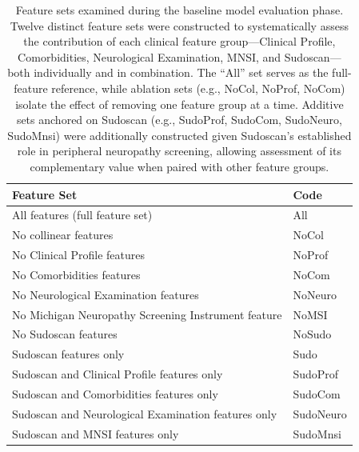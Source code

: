 \documentclass[pdflatex,sn-mathphys-num]{sn-jnl}%
\theoremstyle{thmstyleone}%
\theoremstyle{thmstyletwo}%
\theoremstyle{thmstylethree}%
\begin{document}
\begin{appendices}
\begin{table}[tbp]
    \centering
    \small
    \begin{tabular}{ll}
        \toprule
        Feature Set & Code  \\
        \midrule
        All features (full feature set) &  All   \\
        No collinear features  &  NoCol\\
        No Clinical Profile features  &  NoProf\\
        No Comorbidities features & NoCom \\
        No Neurological Examination features & NoNeuro \\
        No Michigan Neuropathy Screening Instrument feature & NoMSI  \\
        No Sudoscan features & NoSudo \\
        Sudoscan features only & Sudo \\
        Sudoscan and Clinical Profile features only & SudoProf \\
        Sudoscan and Comorbidities features only & SudoCom \\
        Sudoscan and Neurological Examination features only & SudoNeuro \\
        Sudoscan and MNSI features only & SudoMnsi \\
        \bottomrule
    \end{tabular}
    \caption{Feature sets examined during the baseline model evaluation phase. Twelve distinct feature sets were constructed to systematically assess the contribution of each clinical feature group---Clinical Profile, Comorbidities, Neurological Examination, MNSI, and Sudoscan---both individually and in combination. The ``All'' set serves as the full-feature reference, while ablation sets (e.g., NoCol, NoProf, NoCom) isolate the effect of removing one feature group at a time. Additive sets anchored on Sudoscan (e.g., SudoProf, SudoCom, SudoNeuro, SudoMnsi) were additionally constructed given Sudoscan's established role in peripheral neuropathy screening, allowing assessment of its complementary value when paired with other feature groups.}
    \label{tab:feature_sets}
\end{table}


\end{appendices}
\end{document}
